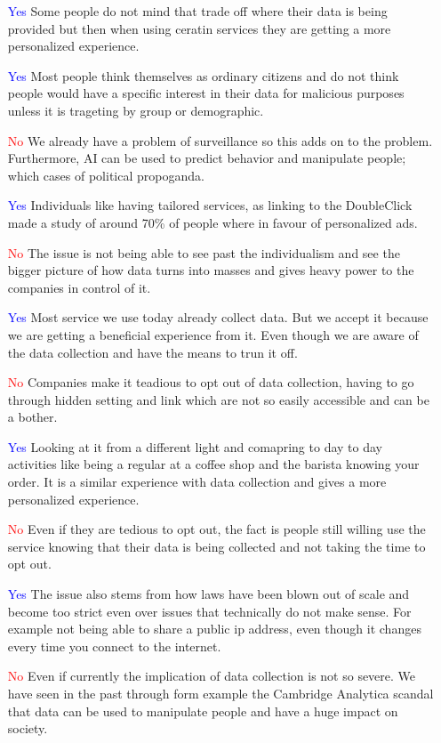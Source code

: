 \documentclass[12pt]{article}
\begin{document}
\begin{itemize}
    \item [\textcolor{blue}{Yes}] Some people do not mind that trade off where their data is being provided but then when using ceratin services they are getting a more personalized experience. 
    \item [\textcolor{blue}{Yes}] Most people think themselves as ordinary citizens and do not think people would have a specific interest in their data for malicious purposes unless it is trageting by group or demographic.
    \item [\textcolor{red}{No}] We already have a problem of surveillance so this adds on to the problem. Furthermore, AI can be used to predict behavior and manipulate people; which cases of political propoganda.
    \item [\textcolor{blue}{Yes}] Individuals like having tailored services, as linking to the DoubleClick made a study of around 70\% of people where in favour of personalized ads.
    \item [\textcolor{red}{No}] The issue is not being able to see past the individualism and see the bigger picture of how data turns into masses and gives heavy power to the companies in control of it.
    \item [\textcolor{blue}{Yes}] Most service we use today already collect data. But we accept it because we are getting a beneficial experience from it. Even though we are aware of the data collection and have the means to trun it off.
    \item [\textcolor{red}{No}] Companies make it teadious to opt out of data collection, having to go through hidden setting and link which are not so easily accessible and can be a bother.
    \item [\textcolor{blue}{Yes}] Looking at it from a different light and comapring to day to day activities like being a regular at a coffee shop and the barista knowing your order. It is a similar experience with data collection and gives a more personalized experience.
    \item [\textcolor{red}{No}] Even if they are tedious to opt out, the fact is people still willing use the service knowing that their data is being collected and not taking the time to opt out.
    \item [\textcolor{blue}{Yes}] The issue also stems from how laws have been blown out of scale and become too strict even over issues that technically do not make sense. For example not being able to share a public ip address, even though it changes every time you connect to the internet.
    \item [\textcolor{red}{No}] Even if currently the implication of data collection is not so severe. We have seen in the past through form example the Cambridge Analytica scandal that data can be used to manipulate people and have a huge impact on society.
\end{itemize}
\end{document}
